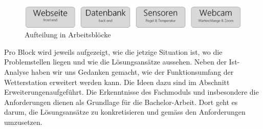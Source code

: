 \vspace{5mm} %

\begin{figure}[h!]
	\centering
	\includegraphics[width=0.8\linewidth]{img/module}
	\caption{Aufteilung in Arbeitsblöcke}
	\label{img:module}
\end{figure}

Pro Block wird jeweils aufgezeigt, wie die jetzige Situation ist, wo die Problemstellen liegen und wie die Lösungsansätze aussehen. Neben der Ist-Analyse haben wir uns Gedanken gemacht, wie der Funktionsumfang der Wetterstation erweitert werden kann. Die Ideen dazu sind im Abschnitt \flqq Erweiterungen\frqq aufgeführt. Die Erkenntnisse des Fachmoduls und insbesondere die Anforderungen dienen als Grundlage für die Bachelor-Arbeit. Dort geht es darum, die Lösungsansätze zu konkretisieren und gemäss den Anforderungen umzusetzen.

\newpage
